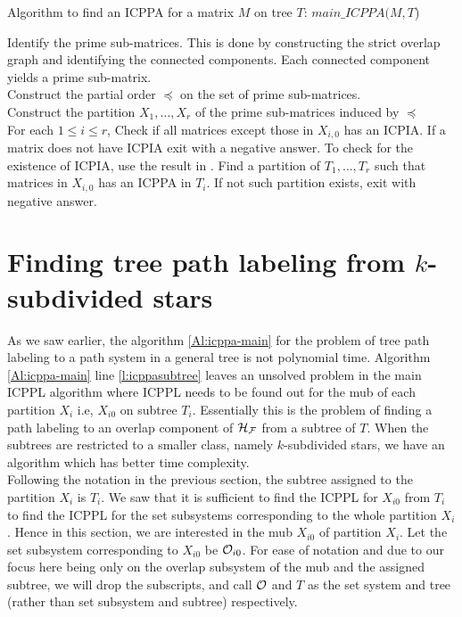 \documentclass{llncs}
\def\cF{{\cal F}}
\def\cH{{\cal H}}
\def\cO{{\cal O}}
\begin{document}
\begin{algorithm}[h]
\caption{Algorithm to find an ICPPA for a matrix $M$ on tree $T$: $main\_ICPPA(M, T$)}
\label{Al:icppa-main}
\begin{algorithmic}
\STATE Identify the prime sub-matrices. This is done by constructing
the strict overlap graph and identifying the connected components. Each
connected component yields a prime sub-matrix.   \\ 
\STATE Construct the partial order $\preccurlyeq$ on the set of prime
sub-matrices.  \\ 
\STATE Construct the partition $X_1,\ldots,X_r$ of the  prime
sub-matrices induced by $\preccurlyeq$ \\
\STATE For each $1 \leq i \leq r$, Check if all matrices except those
in $X_{i,0}$ has an ICPIA.  If a matrix does not have ICPIA exit with
a negative answer.  To check for the existence of ICPIA, use the
result in \cite{nsnrs09}. 
\label{l:icppasubtree} \STATE  Find a partition of $T_1, \ldots, T_r$ such that matrices in
$X_{i,0}$ has an ICPPA in $T_i$.  If not such 
partition exists, exit with negative answer.  
\end{algorithmic}
\end{algorithm}


\section{Finding tree path labeling from $k$-subdivided stars}

As we saw earlier, the algorithm \ref{Al:icppa-main} for the problem
of tree path labeling to a path system in a general tree is not
polynomial time. Algorithm \ref{Al:icppa-main} line
\ref{l:icppasubtree} leaves an unsolved problem in the main ICPPL
algorithm where ICPPL needs to be found out for the mub of each
partition $X_i$ i.e, $X_{i0}$ on subtree $T_i$. Essentially this is
the problem of finding a path labeling to an overlap component of $\cH_\cF$ from a
subtree of $T$.
When the subtrees are restricted to a smaller class, namely 
$k$-subdivided stars, we have an algorithm which has better time complexity.\\


\noindent
Following the notation in the previous section, the subtree assigned to the partition
$X_i$ is $T_i$. We saw that it is sufficient to find the ICPPL for $X_{i0}$
from $T_i$ to find the ICPPL for the set subsystems corresponding to
the whole partition $X_i$. Hence in this section, we are interested in
the mub $X_{i0}$ of partition $X_i$.  Let the set subsystem
corresponding to $X_{i0}$ be $\cO_{i0}$. For ease of notation and due to our focus here being only on the overlap subsystem
of the mub and the assigned subtree, we will drop the subscripts, and
call $\cO$ and $T$ as the set system and tree (rather than set
subsystem and subtree) respectively.\\ 
\end{document}
